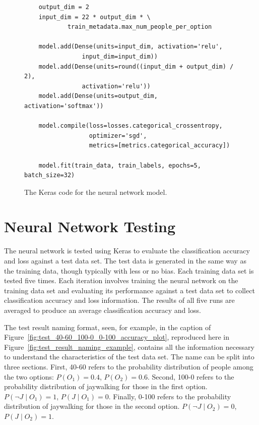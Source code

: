 \documentclass{report}
\begin{document}
\begin{figure}[h]
    \centering
    \begin{verbatim}
    output_dim = 2
    input_dim = 22 * output_dim * \
            train_metadata.max_num_people_per_option

    model.add(Dense(units=input_dim, activation='relu',
                input_dim=input_dim))
    model.add(Dense(units=round((input_dim + output_dim) / 2),
                activation='relu'))
    model.add(Dense(units=output_dim, activation='softmax'))

    model.compile(loss=losses.categorical_crossentropy,
                  optimizer='sgd',
                  metrics=[metrics.categorical_accuracy])
    
    model.fit(train_data, train_labels, epochs=5, batch_size=32)
    \end{verbatim}
    \caption{The Keras code for the neural network model.}
    \label{fig:code_for_keras_model}
\end{figure}

\FloatBarrier
\section{Neural Network Testing}

The neural network is tested using Keras to evaluate the classification accuracy and loss against a
test data set. The test data is generated in the same way as the training data, though typically
with less or no bias. Each training data set is tested five times. Each iteration involves training
the neural network on the training data set and evaluating its performance against a test data set
to collect classification accuracy and loss information. The results of all five runs are averaged
to produce an average classification accuracy and loss.

The test result naming format, seen, for example, in the caption of
Figure~\ref{fig:test_40-60_100-0_0-100_accuracy_plot}, reproduced here in
Figure~\ref{fig:test_result_naming_example}, contains all the information necessary to understand
the characteristics of the test data set. The name can be split into three sections. First, 40-60
refers to the probability distribution of people among the two options: $P(O_1) = 0.4$, $P(O_2) =
0.6$. Second, 100-0 refers to the probability distribution of jaywalking for those in the first
option. $P(\neg J \mid O_1) = 1$, $P(J \mid O_1) = 0$. Finally, 0-100 refers to the probability
distribution of jaywalking for those in the second option. $P(\neg J \mid O_2) = 0$, $P(J \mid O_2)
= 1$.
\end{document}
